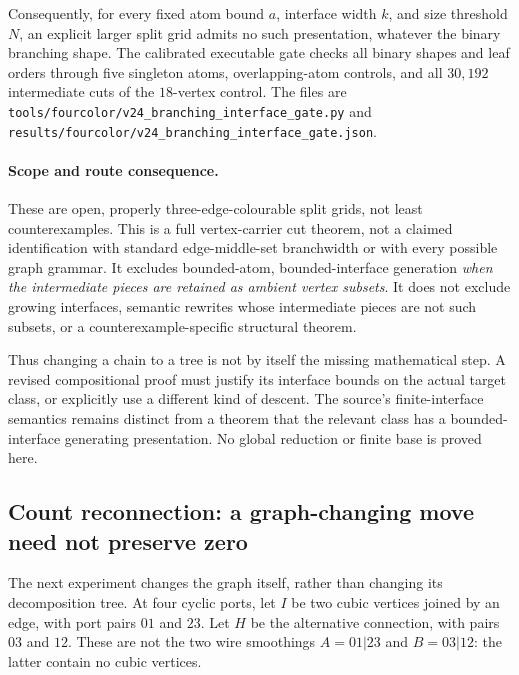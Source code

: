 Consequently, for every fixed atom bound $a$, interface width $k$, and
size threshold $N$, an explicit larger split grid admits no such
presentation, whatever the binary branching shape.
The calibrated executable gate checks all binary shapes and leaf
orders through five singleton atoms, overlapping-atom controls, and
all $30{,}192$ intermediate cuts of the $18$-vertex control.
The files are \texttt{tools/fourcolor/v24\_branching\_interface\_gate.py}
and \texttt{results/fourcolor/v24\_branching\_interface\_gate.json}.

\paragraph{Scope and route consequence.}
These are open, properly three-edge-colourable split grids, not least
counterexamples. This is a full vertex-carrier cut theorem, not a
claimed identification with standard edge-middle-set branchwidth or
with every possible graph grammar. It excludes bounded-atom,
bounded-interface generation \emph{when the intermediate pieces are
retained as ambient vertex subsets}. It does not exclude growing
interfaces, semantic rewrites whose intermediate pieces are not such
subsets, or a counterexample-specific structural theorem.

Thus changing a chain to a tree is not by itself the missing mathematical
step. A revised compositional proof must justify its interface bounds
on the actual target class, or explicitly use a different kind of descent.
The source's finite-interface semantics remains distinct from a theorem
that the relevant class has a bounded-interface generating presentation.
No global reduction or finite base is proved here.

\subsection{Count reconnection: a graph-changing move need not preserve zero}
\label{sec:four-port-count-rewire}

The next experiment changes the graph itself, rather than changing its
decomposition tree. At four cyclic ports, let $I$ be two cubic vertices
joined by an edge, with port pairs $01$ and $23$. Let $H$ be the alternative
connection, with pairs $03$ and $12$. These are not the two wire smoothings
$A=01|23$ and $B=03|12$: the latter contain no cubic vertices.

